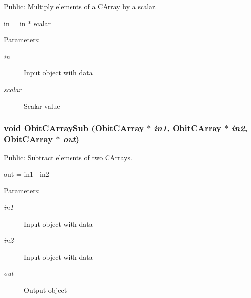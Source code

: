 Public: Multiply elements of a CArray by a scalar. 

in = in $\ast$ scalar \begin{Desc}
\item[Parameters:]
\begin{description}
\item[{\em in}]Input object with data \item[{\em scalar}]Scalar value \end{description}
\end{Desc}
\subsubsection{\setlength{\rightskip}{0pt plus 5cm}void Obit\-CArray\-Sub ({\bf Obit\-CArray} $\ast$ {\em in1}, {\bf Obit\-CArray} $\ast$ {\em in2}, {\bf Obit\-CArray} $\ast$ {\em out})}\label{ObitCArray_8c_a23}


Public: Subtract elements of two CArrays. 

out = in1 - in2 \begin{Desc}
\item[Parameters:]
\begin{description}
\item[{\em in1}]Input object with data \item[{\em in2}]Input object with data \item[{\em out}]Output object \end{description}
\end{Desc}
